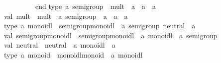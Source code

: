 \begin{isabellebody}
\begin{isamarkuptext}
\ \ \ \ \ \ \ \ \ end{}{}\isanewline
\isanewline
type\ {}a\ semigroup\ {}\ {}mult\ {}\ {}a\ {}{}\ {}a\ {}{}\ {}a{}{}\isanewline
val\ mult\ {}\ {}mult\ {}\ {}a\ semigroup\ {}{}\ {}a\ {}{}\ {}a\ {}{}\ {}a{}\isanewline
\isanewline
type\ {}a\ monoidl\ {}\ {}semigroup{}monoidl\ {}\ {}a\ semigroup{}\ neutral\ {}\ {}a{}{}\isanewline
val\ semigroup{}monoidl\ {}\ {}semigroup{}monoidl\ {}\ {}a\ monoidl\ {}{}\ {}a\ semigroup{}\isanewline
val\ neutral\ {}\ {}neutral\ {}\ {}a\ monoidl\ {}{}\ {}a{}\isanewline
\isanewline
type\ {}a\ monoid\ {}\ {}monoidl{}monoid\ {}\ {}a\ monoidl{}{}\isanewline

\end{isamarkuptext}
\end{isabellebody}
